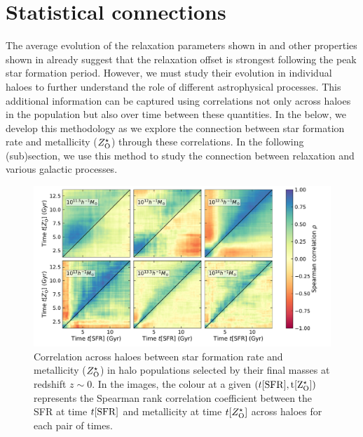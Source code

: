 \section{Statistical connections}
\label{sec:methods-stat}
The average evolution of the relaxation parameters shown in  and other properties shown in  already suggest that the relaxation offset is strongest following the peak star formation period. However, we must study their evolution in individual haloes to further understand the role of different astrophysical processes. This additional information can be captured using correlations not only across haloes in the population but also over time between these quantities. In the  below, we develop this methodology as we explore the connection between star formation rate and metallicity ($Z^{\star}_{\rm{O}}$) through these correlations. In the following (sub)section, we use this method to study the connection between relaxation and various galactic processes. 

\begin{figure}[bhtp]
\centering
\includegraphics[width=\linewidth]{plots/dynam_relxn/Spea_correl_betw_SFR-Z(O)_SFreg.pdf}
\caption{Correlation across haloes between star formation rate and metallicity ($Z^{\star}_{\rm{O}}$) in halo populations selected by their final masses at redshift $z\sim 0$. In the images, the colour at a given $(t[\rm{SFR}],t[Z^{\star}_{\rm{O}}])$ represents the Spearman rank correlation coefficient between the SFR at time $t[\rm{SFR}]$ and metallicity at time $t[Z^{\star}_{\rm{O}}]$ across haloes for each pair of times.}
\label{fig:dynam-correl-sfr-ZOsfr-img}
\end{figure}

